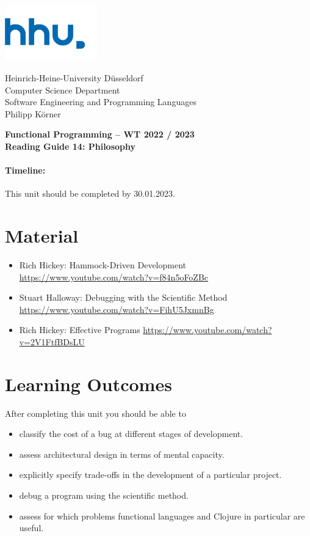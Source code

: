\documentclass[11pt,a4paper]{article}
\begin{document}
\begin{minipage}[b]{\textwidth}
	\parbox[t]{5cm}{%
		\includegraphics[width=4cm]{unilogo}
		\hfill
	}
	\parbox[b]{11cm}{%
		Heinrich-Heine-University D\"usseldorf\\
		Computer Science Department\\
		Software Engineering and Programming Languages\\
		Philipp K\"orner
	}
\end{minipage}
\begin{center}
	\bf
	Functional Programming -- WT 2022 / 2023\\
	Reading Guide 14: Philosophy
\end{center}

\pagestyle{empty}

\paragraph{Timeline:} This unit should be completed by 30.01.2023.

\section{Material} 

\begin{itemize}
\item Rich Hickey: Hammock-Driven Development \url{https://www.youtube.com/watch?v=f84n5oFoZBc}
\item Stuart Halloway: Debugging with the Scientific Method \url{https://www.youtube.com/watch?v=FihU5JxmnBg}
\item Rich Hickey: Effective Programs \url{https://www.youtube.com/watch?v=2V1FtfBDsLU}
\end{itemize}


\section{Learning Outcomes}

After completing this unit you should be able to

\begin{itemize}
    \item classify the cost of a bug at different stages of development.
    \item assess architectural design in terms of mental capacity.
    \item explicitly specify trade-offs in the development of a particular project.
    \item debug a program using the scientific method.
    \item assess for which problems functional languages and Clojure in particular are useful.
\end{itemize}
\end{document}
